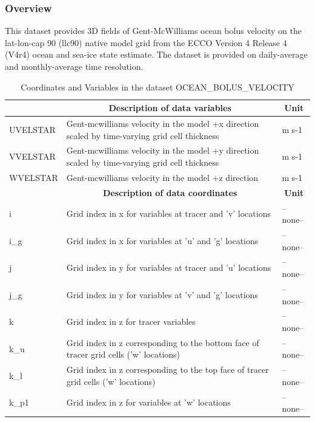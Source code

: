 \subsubsection{Overview}
This dataset provides 3D fields of Gent-McWilliams ocean bolus velocity on the lat-lon-cap 90 (llc90) native model grid from the ECCO Version 4 Release 4 (V4r4) ocean and sea-ice state estimate. The dataset is provided on daily-average and monthly-average time resolution. 
\begin{longtable}{|m{}|m{}|m{}|}
\caption{Coordinates and Variables in the dataset OCEAN\_BOLUS\_VELOCITY}
\label{tab:table-OCEAN_BOLUS_VELOCITY-fields} \\ 
\hline \endhead \hline \endfoot
\rowcolor{lightgray} \multicolumn{1}{|c|}{\textbf{Variables}} & \multicolumn{1}{|c|}{\textbf{Description of data variables}} &  \multicolumn{1}{|c|}{\textbf{Unit}}\\ \hline
UVELSTAR &Gent-mcwilliams velocity in the model +x direction scaled by time-varying grid cell thickness &m s-1  \\ \hline
VVELSTAR &Gent-mcwilliams velocity in the model +y direction scaled by time-varying grid cell thickness &m s-1  \\ \hline
WVELSTAR &Gent-mcwilliams velocity in the model +z direction &m s-1  \\ \hline
\rowcolor{lightgray} \multicolumn{1}{|c|}{\textbf{Coordinates}} & \multicolumn{1}{|c|}{\textbf{Description of data coordinates}} &  \multicolumn{1}{|c|}{\textbf{Unit}}\\ \hline
i &Grid index in x for variables at tracer and 'v' locations &--none--  \\ \hline
i\_g &Grid index in x for variables at 'u' and 'g' locations &--none--  \\ \hline
j &Grid index in y for variables at tracer and 'u' locations &--none--  \\ \hline
j\_g &Grid index in y for variables at 'v' and 'g' locations &--none--  \\ \hline
k &Grid index in z for tracer variables &--none--  \\ \hline
k\_u &Grid index in z corresponding to the bottom face of tracer grid cells ('w' locations) &--none--  \\ \hline
k\_l &Grid index in z corresponding to the top face of tracer grid cells ('w' locations) &--none--  \\ \hline
k\_p1 &Grid index in z for variables at 'w' locations &--none--  \\ \hline

\end{longtable}
